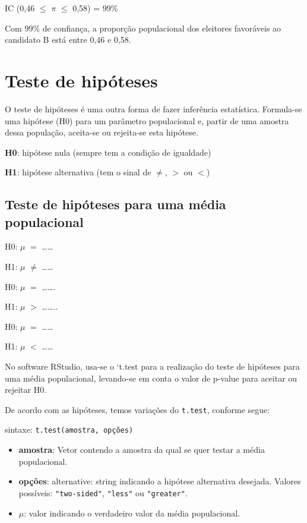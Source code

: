 \documentclass[12pt,brazil,]{book}
\providecommand{\tightlist}{%
  \setlength{\itemsep}{0pt}\setlength{\parskip}{0pt}}
\begin{document}
IC (0,46 \(\leq\) \(\pi\) \(\leq\) 0,58) = 99\%

Com 99\% de confiança, a proporção populacional dos eleitores favoráveis
ao candidato B está entre 0,46 e 0,58.

\hypertarget{teste-de-hipoteses}{%
\section{Teste de hipóteses}\label{teste-de-hipoteses}}

O teste de hipóteses é uma outra forma de fazer inferência estatística.
Formula-se uma hipótese (H0) para um parâmetro populacional e, partir de
uma amostra dessa população, aceita-se ou rejeita-se esta hipótese.

\textbf{H0}: hipótese nula (sempre tem a condição de igualdade)

\textbf{H1}: hipótese alternativa (tem o sinal de \(\neq\), \(>\) ou
\(<\))

\hypertarget{teste-de-hipoteses-para-uma-media-populacional}{%
\subsection{Teste de hipóteses para uma média
populacional}\label{teste-de-hipoteses-para-uma-media-populacional}}

H0: \(\mu\) \(=\) \ldots{}\ldots{}

H1: \(\mu\) \(\neq\) \ldots{}\ldots{}

H0: \(\mu\) \(=\) \ldots{}\ldots{}.

H1: \(\mu\) \(>\) \ldots{}\ldots{}..

H0: \(\mu\) \(=\) \ldots{}\ldots{}

H1: \(\mu\) \(<\) \ldots{}\ldots{}

No software RStudio, usa-se o `t.test\textbar{} para a realização do
teste de hipóteses para uma média populacional, levando-se em conta o
valor de p-value para aceitar ou rejeitar H0.

De acordo com as hipóteses, temos variações do \texttt{t.test}, conforme
segue:

sintaxe: \texttt{t.test(amostra,\ opções)}

\begin{itemize}
\tightlist
\item
  \textbf{amostra}: Vetor contendo a amostra da qual se quer testar a
  média populacional.
\item
  \textbf{opções}: alternative: string indicando a hipótese alternativa
  desejada. Valores possíveis: \texttt{"two-sided"}, \texttt{"less"} ou
  \texttt{"greater"}.
\item
  \(\mu\): valor indicando o verdadeiro valor da média populacional.
\end{itemize}
\end{document}
